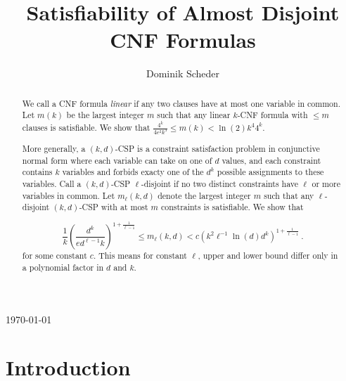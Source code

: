 \documentclass[envcountsect, envcountsame]{llncs}
\begin{document}
\frontmatter
\pagestyle{headings}
\title{Satisfiability of Almost Disjoint CNF Formulas}

\author{Dominik Scheder}
\maketitle
\begin{center}
 \today
\end{center}

\begin{abstract}
  We call a CNF formula {\em linear} if any two clauses have at most
  one variable in common. Let $m(k)$ be the largest integer $m$ such that
  any linear $k$-CNF formula with $\leq m$ clauses is satisfiable.
  We show that $\frac{4^k}{4e^2k^3} \leq m(k) < \ln(2) k^4 4^k$.

  More generally, a $(k,d)$-CSP is a constraint satisfaction problem
  in conjunctive normal form where each variable can take on one of $d$ 
  values, and each constraint contains $k$ variables and 
  forbids exacty one of the $d^k$ possible assignments to these variables.
  Call a $(k,d)$-CSP $\ell$-disjoint if no two distinct constraints have
  $\ell$ or more variables in common. Let $m_{\ell}(k,d)$ denote the
  largest integer $m$ such that any $\ell$-disjoint $(k,d)$-CSP with	
  at most $m$ constraints is 
  satisfiable. We show that

  $$\frac{1}{k} \left(\frac{d^k}{ed^{\ell -1}k}\right)^{1+\frac{1}{\ell -1}}
  \leq m_{\ell}(k,d) < c\left(k^2\ell^{-1}\ln(d)d^k\right)^{1+\frac{1}{\ell -1}} \ .
  $$
  for some constant $c$.  This means for constant $\ell$, upper and
  lower bound differ only in a polynomial factor in $d$ and $k$.
\end{abstract}

\section{Introduction}
\end{document}
